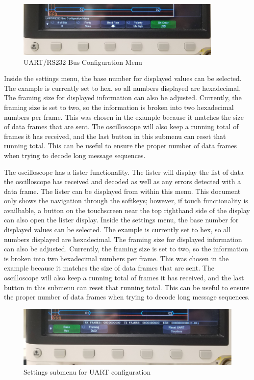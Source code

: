 \documentclass{article}
\begin{document}
  \begin{figure}[h]
    \centering
    \includegraphics[width=0.9\textwidth]{bus_config}
    \caption{UART/RS232 Bus Configuration Menu}
  \end{figure}

  Inside the settings menu, the base number for displayed values can be
  selected. The example is currently set to hex, so all numbers displayed are
  hexadecimal. The framing size for displayed information can also be adjusted.
  Currently, the framing size is set to two, so the information is broken into
  two hexadecimal numbers per frame. This was chosen in the example because it
  matches the size of data frames that are sent. The oscilloscope will also keep
  a running total of frames it has received, and the last button in this submenu
  can reset that running total. This can be useful to ensure the proper number
  of data frames when trying to decode long message sequences.

  The oscilloscope has a lister functionality. The lister will display the list
  of data the oscilloscope has received and decoded as well as any errors
  detected with a data frame. The lister can be displayed from within this menu.
  This document only shows the navigation through the softkeys; however, if
  touch functionality is availbable, a button on the touchscreen near the top
  righthand side of the display can also open the lister display.
  Inside the settings menu, the base number for displayed values can be
  selected. The example is currently set to hex, so all numbers displayed are
  hexadecimal. The framing size for displayed information can also be adjusted.
  Currently, the framing size is set to two, so the information is broken into
  two hexadecimal numbers per frame. This was chosen in the example because it
  matches the size of data frames that are sent. The oscilloscope will also keep
  a running total of frames it has received, and the last button in this submenu
  can reset that running total. This can be useful to ensure the proper number
  of data frames when trying to decode long message sequences.

  \begin{figure}[ht]
    \includegraphics[width=\textwidth]{uart_settings}
    \caption{Settings submenu for UART configuration}
  \end{figure}
\end{document}
